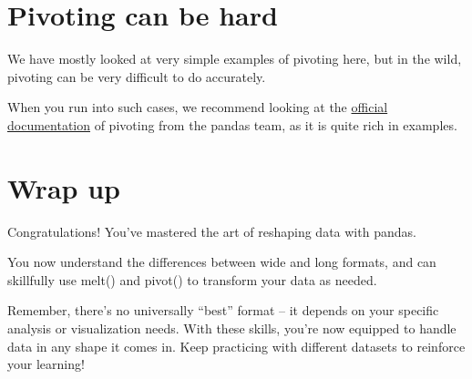 \documentclass[
  letterpaper,
  DIV=11,
  numbers=noendperiod]{scrreprt}
\begin{document}
\section{Pivoting can be hard}\label{pivoting-can-be-hard}

We have mostly looked at very simple examples of pivoting here, but in
the wild, pivoting can be very difficult to do accurately.

When you run into such cases, we recommend looking at the
\href{https://pandas.pydata.org/docs/user_guide/reshaping.html}{official
documentation} of pivoting from the pandas team, as it is quite rich in
examples.

\section{Wrap up}\label{wrap-up-10}

Congratulations! You've mastered the art of reshaping data with pandas.

You now understand the differences between wide and long formats, and
can skillfully use melt() and pivot() to transform your data as needed.

Remember, there's no universally ``best'' format -- it depends on your
specific analysis or visualization needs. With these skills, you're now
equipped to handle data in any shape it comes in. Keep practicing with
different datasets to reinforce your learning!
\end{document}
